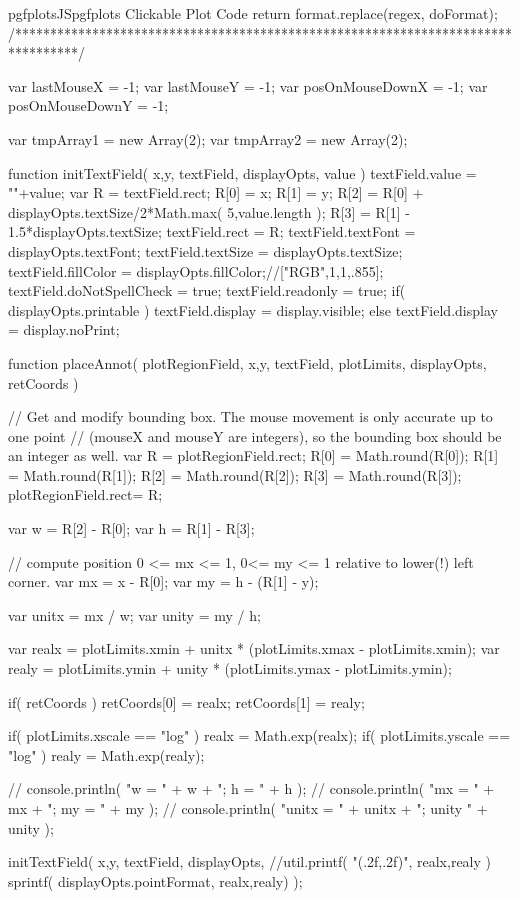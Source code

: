 {{\begin{insDLJS}[processAnnotatedPlot]{pgfplotsJS}{pgfplots Clickable Plot Code}
{    return format.replace(regex, doFormat);
}
/*********************************************************************************/


var lastMouseX = -1;
var lastMouseY = -1;
var posOnMouseDownX = -1;
var posOnMouseDownY = -1;

var tmpArray1 = new Array(2);
var tmpArray2 = new Array(2);

function initTextField( x,y, textField, displayOpts, value )
{
	textField.value = ""+value;
	var R = textField.rect;
	R[0] = x;
	R[1] = y;
	R[2] = R[0] + displayOpts.textSize/2*Math.max( 5,value.length );
	R[3] = R[1] - 1.5*displayOpts.textSize;
	textField.rect = R;
	textField.textFont = displayOpts.textFont;
	textField.textSize = displayOpts.textSize;
	textField.fillColor = displayOpts.fillColor;//["RGB",1,1,.855];
	textField.doNotSpellCheck = true;
	textField.readonly = true;
	if( displayOpts.printable )
		textField.display = display.visible;
	else
		textField.display = display.noPrint;
}

function placeAnnot( plotRegionField, x,y, textField, plotLimits, displayOpts, retCoords )
{
	// Get and modify bounding box. The mouse movement is only accurate up to one point 
	// (mouseX and mouseY are integers), so the bounding box should be an integer as well.
	var R = plotRegionField.rect;
	R[0] = Math.round(R[0]);
	R[1] = Math.round(R[1]);
	R[2] = Math.round(R[2]);
	R[3] = Math.round(R[3]);
	plotRegionField.rect= R;

	var w = R[2] - R[0];
	var h = R[1] - R[3];

	// compute position 0 <= mx <= 1, 0<= my <= 1 relative to lower(!) left corner.
	var mx = x - R[0];
	var my = h - (R[1] - y);

	var unitx = mx / w;
	var unity = my / h;

	var realx = plotLimits.xmin + unitx * (plotLimits.xmax - plotLimits.xmin);
	var realy = plotLimits.ymin + unity * (plotLimits.ymax - plotLimits.ymin);

	if( retCoords ) {
		retCoords[0] = realx;
		retCoords[1] = realy;
	}

	if( plotLimits.xscale == "log" )
		realx = Math.exp(realx);
	if( plotLimits.yscale == "log" )
		realy = Math.exp(realy);

//	console.println( "w = " + w + "; h = " + h );
//	console.println( "mx = " + mx + "; my = " + my );
//	console.println( "unitx = " + unitx + "; unity " + unity );

	initTextField( x,y, textField, displayOpts,
		//util.printf( "(\pgfplotsPERCENT.2f,\pgfplotsPERCENT.2f)", realx,realy )
		sprintf( displayOpts.pointFormat, realx,realy) );

}
\end{insDLJS}}}
